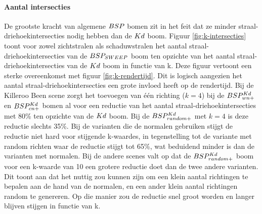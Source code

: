 \paragraph{Aantal intersecties}
De grootste kracht van algemene $BSP$ bomen zit in het feit dat ze minder straal-driehoekintersecties nodig hebben dan de $Kd$ boom.
Figuur \ref{fig:k-intersecties} toont voor zowel zichtstralen als schaduwstralen het aantal straal-driehoekintersecties van de $BSP_{SWEEP}$ boom ten opzichte van het aantal straal-driehoekintersecties van de $Kd$ boom in functie van k.
Deze figuur vertoont een sterke overeenkomst met figuur \ref{fig:k-rendertijd}. 
Dit is logisch aangezien het aantal straal-driehoekintersecties een grote invloed heeft op de rendertijd.
Bij de Killeroo Been scene zorgt het toevoegen van één richting ($k = 4$) bij de $BSP^{Kd}_{wn+}$ en $BSP^{Kd}_{cn+}$ bomen al voor een reductie van het aantal straal-driehoekintersecties met 80\% ten opzichte van de $Kd$ boom. Bij de $BSP^{Kd}_{random+}$ met $k = 4$ is deze reductie slechts 35\%. Bij de varianten die de normalen gebruiken stijgt de reductie niet hard voor stijgende k-waardes, in tegenstelling tot de variante met random richten waar de reductie stijgt tot 65\%, wat beduidend minder is dan de varianten met normalen.
Bij de andere scenes valt op dat de $BSP^{Kd}_{random+}$ boom voor een k-waarde van 10 een grotere reductie doet dan de twee andere varianten.
Dit toont aan dat het nuttig zou kunnen zijn om een klein aantal richtingen te bepalen aan de hand van de normalen, en een ander klein aantal richtingen random te genereren. Op die manier zou de reductie snel groot worden en langer blijven stijgen in functie van k.

